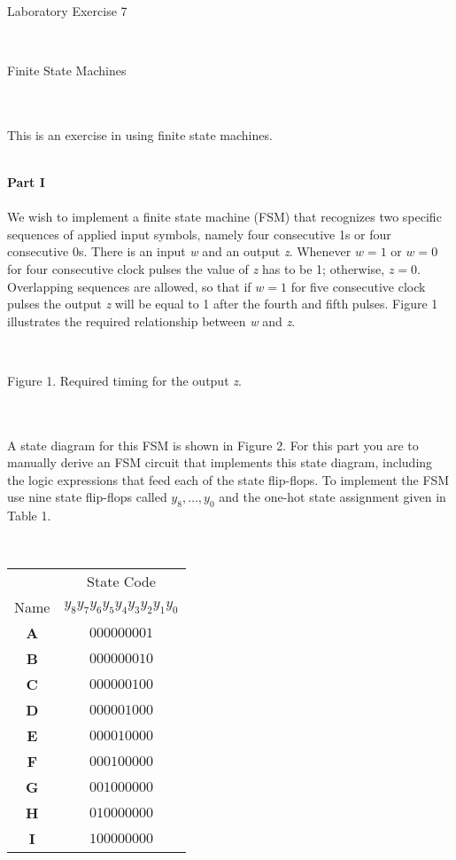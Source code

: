 \documentclass[epsfig,10pt,fullpage]{article}
\begin{document}
~\\
~\\
~\\
\centerline{\huge Laboratory Exercise 7}
~\\
\centerline{\large Finite State Machines}
~\\
~\\
\noindent
This is an exercise in using finite state machines.

~\\
\noindent
{\bf Part I}
~\\
~\\
\noindent
We wish to implement a finite state machine (FSM) that recognizes two specific sequences 
of applied input symbols, namely four consecutive 1s or four consecutive 0s. There is an 
input {\it w} and an output {\it z}. Whenever $w = 1$
or $w = 0$ for four consecutive clock pulses the value of {\it z} has to be 1; 
otherwise, $z = 0$. Overlapping sequences
are allowed, so that if $w = 1$ for five consecutive clock pulses the output {\it z}
will be equal to 1 after the fourth and
fifth pulses. Figure 1 illustrates the required relationship between {\it w} and {\it z}.

~\\
\begin{figure}[H]
\scriptsize
\centerline{
\hbox{}}
\end{figure}
\centerline{Figure 1.  Required timing for the output {\it z}.}
~\\
~\\
A state diagram for this FSM is shown in Figure 2. For this part you are to manually
derive an FSM circuit that implements this state diagram, including the logic expressions
that feed each of the state flip-flops. To
implement the FSM use nine state flip-flops called $y_8, \ldots, y_0$ and the 
one-hot state assignment given in Table 1.

~\\
\begin{center}
\begin{tabular}{c|c}
~ & State Code \\ 
Name & $y_8 y_7 y_6 y_5 y_4 y_3 y_2 y_1 y_0$ \\ \hline
\rule[-0.075in]{0in}{0.25in}{\bf A} & $000000001$ \\ 
{\bf B} & $000000010$ \\ 
{\bf C} & $000000100$ \\ 
{\bf D} & $000001000$ \\ 
{\bf E} & $000010000$ \\ 
{\bf F} & $000100000$ \\ 
{\bf G} & $001000000$ \\ 
{\bf H} & $010000000$ \\ 
{\bf I} & $100000000$ \\ 
\end{tabular}
\end{center}
\end{document}
